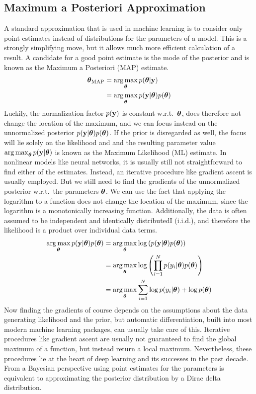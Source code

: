 \documentclass[../thesis.tex]{subfiles}
\begin{document}
\subsection{Maximum a Posteriori Approximation}
A standard approximation that is used in machine learning is to consider only point estimates instead of distributions for the parameters of a model. This is a strongly simplifying move, but it allows much more efficient calculation of a result. A candidate for a good point estimate is the mode of the posterior and is known as the Maximum a Posteriori (MAP) estimate.
\begin{align}
    \boldsymbol{\mathbf{\theta}}_{\mathrm{MAP}} &= \operatorname*{arg\,max}_{\boldsymbol{\mathbf{\theta}}} p(\boldsymbol{\mathbf{\theta}} | \boldsymbol{\mathbf{y}}) \\
    &= \operatorname*{arg\,max}_{\boldsymbol{\mathbf{\theta}}} p(\boldsymbol{\mathbf{y}} | \boldsymbol{\mathbf{\theta}}) p(\boldsymbol{\mathbf{\theta}}) \\
\end{align}
Luckily, the normalization factor $p(\boldsymbol{\mathbf{y}})$ is constant w.r.t.\ $\boldsymbol{\mathbf{\theta}}$, does therefore not change the location of the maximum, and we can focus instead on the unnormalized posterior $p(\boldsymbol{\mathbf{y}} | \boldsymbol{\mathbf{\theta}}) p(\boldsymbol{\mathbf{\theta}})$. If the prior is disregarded as well, the focus will lie solely on the likelihood and and the resulting parameter value $\operatorname*{arg\,max}_{\boldsymbol{\mathbf{\theta}}} p(\boldsymbol{\mathbf{y}} | \boldsymbol{\mathbf{\theta}})$ is known as the Maximum Likelihood (ML) estimate. In nonlinear models like neural networks, it is usually still not straightforward to find either of the estimates. Instead, an iterative procedure like gradient ascent is usually employed. But we still need to find the gradients of the unnormalized posterior w.r.t.\ the parameters $\boldsymbol{\mathbf{\theta}}$. We can use the fact that applying the logarithm to a function does not change the location of the maximum, since the logarithm is a monotonically increasing function. Additionally, the data is often assumed to be independent and identically distributedI (i.i.d.), and therefore the likelihood is a product over individual data terms. 
\begin{align}
    \operatorname*{arg\,max}_{\boldsymbol{\mathbf{\theta}}} p(\boldsymbol{\mathbf{y}} | \boldsymbol{\mathbf{\theta}}) p(\boldsymbol{\mathbf{\theta}}) &= \operatorname*{arg\,max}_{\boldsymbol{\mathbf{\theta}}} \log \left( p(\boldsymbol{\mathbf{y}} | \boldsymbol{\mathbf{\theta}}) p(\boldsymbol{\mathbf{\theta}}) \right) \\
    &= \operatorname*{arg\,max}_{\boldsymbol{\mathbf{\theta}}} \log \left( \prod_{i=1}^N p(y_i | \boldsymbol{\mathbf{\theta}}) p(\boldsymbol{\mathbf{\theta}}) \right) \\
    &= \operatorname*{arg\,max}_{\boldsymbol{\mathbf{\theta}}} \sum_{i=1}^N \log p(y_i | \boldsymbol{\mathbf{\theta}})  +  \log p(\boldsymbol{\mathbf{\theta}})
\end{align}
Now finding the gradients of course depends on the assumptions about the data generating likelihood and the prior, but automatic differentiation, built into most modern machine learning packages, can usually take care of this. Iterative procedures like gradient ascent are usually not guaranteed to find the global maximum of a function, but instead return a local maximum. Nevertheless, these procedures lie at the heart of deep learning and its successes in the past decade. From a Bayesian perspective using point estimates for the parameters is equivalent to approximating the posterior distribution by a Dirac delta distribution. 
\end{document}
